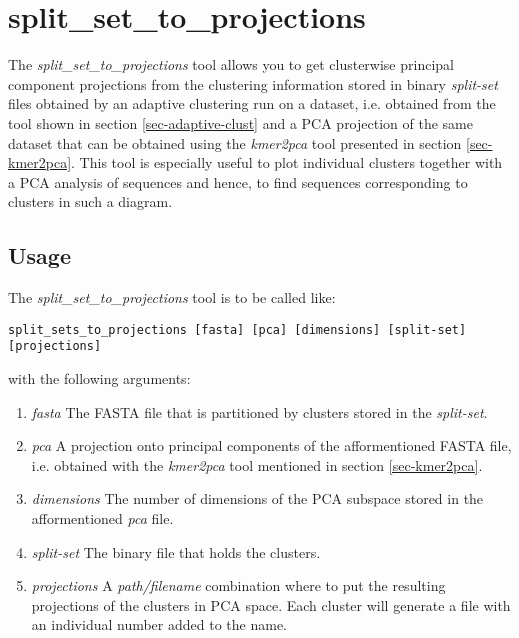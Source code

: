 \section{split\_set\_to\_projections} \label{sec-ssproj}

The \emph{split\_set\_to\_projections} tool allows you to get clusterwise
principal component projections from the clustering information stored in
binary \emph{split-set} files obtained by an adaptive clustering run
on a dataset, i.e. obtained from the tool shown in section
\ref{sec-adaptive-clust} and a PCA projection of the same dataset that
can be obtained using the \emph{kmer2pca} tool presented in section
\ref{sec-kmer2pca}.
This tool is especially useful to plot individual clusters together
with a PCA analysis of sequences and hence, to find sequences
corresponding to clusters in such a diagram. 

\subsection{Usage}

The \emph{split\_set\_to\_projections} tool is to be called like:

\begin{lstlisting}
split_sets_to_projections [fasta] [pca] [dimensions] [split-set] [projections]
\end{lstlisting}
with the following arguments:
\begin{enumerate}
\item \emph{fasta} The FASTA file that is partitioned by clusters stored in
  the \emph{split-set}.
  \item \emph{pca} A projection onto principal components of the
    afformentioned FASTA file, i.e. obtained with the \emph{kmer2pca}
    tool mentioned in section \ref{sec-kmer2pca}.
  \item \emph{dimensions} The number of dimensions of the PCA subspace stored
    in the afformentioned \emph{pca} file.
  \item \emph{split-set} The binary file that holds the clusters.
  \item \emph{projections} A \emph{path/filename} combination where to put
    the resulting projections of the clusters in PCA space. Each
    cluster will generate a file with an individual number added to
    the name.
\end{enumerate}

